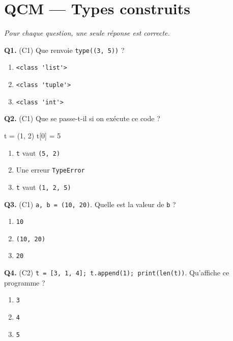 \section*{QCM --- Types construits}
\textit{Pour chaque question, une seule réponse est correcte.}

\bigskip

\textbf{Q1.} (C1) Que renvoie \lstinline{type((3, 5))} ?
\begin{enumerate}[label=\Alph*.]
  \item \lstinline{<class 'list'>}
  \item \lstinline{<class 'tuple'>}
  \item \lstinline{<class 'int'>}
\end{enumerate}

\textbf{Q2.} (C1) Que se passe-t-il si on exécute ce code ?
\begin{python}
t = (1, 2)
t[0] = 5
\end{python}
\begin{enumerate}[label=\Alph*.]
  \item \lstinline{t} vaut \lstinline{(5, 2)}
  \item Une erreur \lstinline{TypeError}
  \item \lstinline{t} vaut \lstinline{(1, 2, 5)}
\end{enumerate}

\textbf{Q3.} (C1) \lstinline{a, b = (10, 20)}. Quelle est la valeur de \lstinline{b} ?
\begin{enumerate}[label=\Alph*.]
  \item \lstinline{10}
  \item \lstinline{(10, 20)}
  \item \lstinline{20}
\end{enumerate}

\textbf{Q4.} (C2) \lstinline{t = [3, 1, 4]; t.append(1); print(len(t))}. Qu'affiche ce programme ?
\begin{enumerate}[label=\Alph*.]
  \item \lstinline{3}
  \item \lstinline{4}
  \item \lstinline{5}
\end{enumerate}

